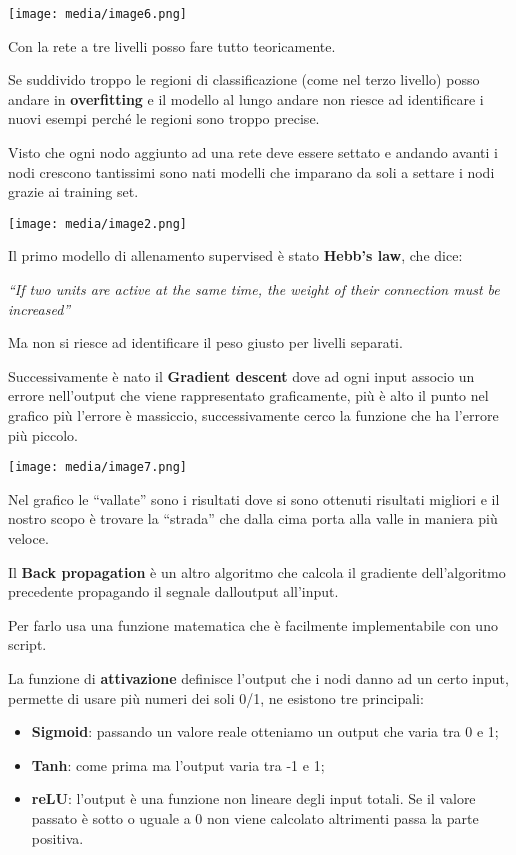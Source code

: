 \texttt{[image: media/image6.png]}

Con la rete a tre livelli posso fare tutto teoricamente.

Se suddivido troppo le regioni di classificazione (come nel terzo
livello) posso andare in \textbf{overfitting} e il modello al lungo
andare non riesce ad identificare i nuovi esempi perché le regioni sono
troppo precise.

Visto che ogni nodo aggiunto ad una rete deve essere settato e andando
avanti i nodi crescono tantissimi sono nati modelli che imparano da soli
a settare i nodi grazie ai training set.

\texttt{[image: media/image2.png]}

Il primo modello di allenamento supervised è stato \textbf{Hebb's law},
che dice:

\emph{``If two units are active at the same time, the weight of their
connection must be increased''}

Ma non si riesce ad identificare il peso giusto per livelli separati.

Successivamente è nato il \textbf{Gradient descent} dove ad ogni input
associo un errore nell'output che viene rappresentato graficamente, più
è alto il punto nel grafico più l'errore è massiccio, successivamente
cerco la funzione che ha l'errore più piccolo.

\texttt{[image: media/image7.png]}

Nel grafico le ``vallate'' sono i risultati dove si sono ottenuti
risultati migliori e il nostro scopo è trovare la ``strada'' che dalla
cima porta alla valle in maniera più veloce.

Il \textbf{Back propagation} è un altro algoritmo che calcola il
gradiente dell'algoritmo precedente propagando il segnale
dall\textquotesingle output all'input.

Per farlo usa una funzione matematica che è facilmente implementabile
con uno script.

La funzione di \textbf{attivazione} definisce l'output che i nodi danno
ad un certo input, permette di usare più numeri dei soli 0/1, ne
esistono tre principali:

\begin{itemize}
\item
  \textbf{Sigmoid}: passando un valore reale otteniamo un output che
  varia tra 0 e 1;
\item
  \textbf{Tanh}: come prima ma l'output varia tra -1 e 1;
\item
  \textbf{reLU}: l'output è una funzione non lineare degli input totali.
  Se il valore passato è sotto o uguale a 0 non viene calcolato
  altrimenti passa la parte positiva.
\end{itemize}

